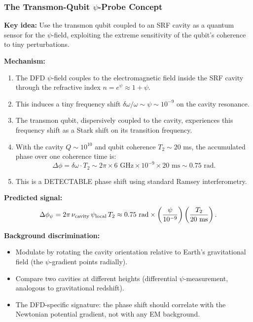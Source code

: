 \documentclass[11pt]{article}
\begin{document}
\subsubsection{The Transmon-Qubit $\psi$-Probe Concept}

\begin{tcolorbox}[colback=red!5!white, colframe=red!70!black,
  title=\textbf{NEW: P11 Transmon-Qubit $\psi$-Probe Experimental Concept}]

\textbf{Key idea:} Use the transmon qubit coupled to an SRF cavity
as a quantum sensor for the $\psi$-field, exploiting the extreme
sensitivity of the qubit's coherence to tiny perturbations.

\textbf{Mechanism:}
\begin{enumerate}
  \item The DFD $\psi$-field couples to the electromagnetic field
    inside the SRF cavity through the refractive index
    $n = e^\psi \approx 1 + \psi$.
  \item This induces a tiny frequency shift
    $\delta\omega/\omega \sim \psi \sim 10^{-9}$ on the cavity
    resonance.
  \item The transmon qubit, dispersively coupled to the cavity,
    experiences this frequency shift as a Stark shift on its
    transition frequency.
  \item With the cavity $Q \sim 10^{10}$ and qubit coherence
    $T_2 \sim 20$ ms, the accumulated phase over one coherence
    time is:
    \begin{equation}
      \Delta\phi = \delta\omega \cdot T_2
      \sim 2\pi \times 6\text{ GHz} \times 10^{-9} \times 20\text{ ms}
      \sim 0.75 \text{ rad}.
    \end{equation}
  \item This is a DETECTABLE phase shift using standard Ramsey
    interferometry.
\end{enumerate}

\textbf{Predicted signal:}
\begin{equation}
  \Delta\phi_\psi = 2\pi\,\nu_{\rm cavity}\,\psi_{\rm local}\,T_2
  \approx 0.75 \text{ rad} \times \left(\frac{\psi}{10^{-9}}\right)
  \left(\frac{T_2}{20\text{ ms}}\right).
\end{equation}

\textbf{Background discrimination:}
\begin{itemize}
  \item Modulate by rotating the cavity orientation relative to
    Earth's gravitational field (the $\psi$-gradient points radially).
  \item Compare two cavities at different heights (differential
    $\psi$-measurement, analogous to gravitational redshift).
  \item The DFD-specific signature: the phase shift should correlate
    with the Newtonian potential gradient, not with any EM background.
\end{itemize}


\end{tcolorbox}
\end{document}
